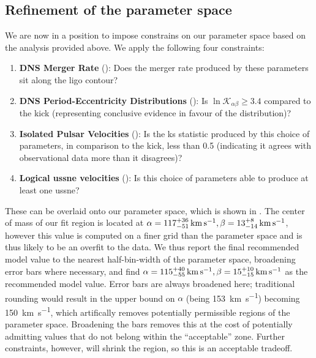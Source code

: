 \subsection{Refinement of the parameter space}

We are now in a position to impose constrains on our parameter space based on the analysis provided above. We apply the following four constraints:

\begin{enumerate}
    \item \textbf{DNS Merger Rate} (): Does the merger rate produced by these parameters sit along the \gls{ligo} contour?
    \item \textbf{DNS Period-Eccentricity Distributions} (): Is $\ln\mathcal{K}_{\alpha\beta}\geq 3.4$ compared to the \citet{Hobbs:2005} kick (representing conclusive evidence in favour of the distribution)?
    \item \textbf{Isolated Pulsar Velocities} (): Is the \gls{ks} statistic produced by this choice of parameters, in comparison to the \citet{Willcox:2021} kick, less than 0.5 (indicating it agrees with observational data more than it disagrees)?
    \item \textbf{Logical \gls{ussne} velocities} (): Is this choice of parameters able to produce at least one \gls{ussne}?
\end{enumerate}

These can be overlaid onto our parameter space, which is shown in . The center of mass of our fit region is located at $\alpha=\SI[parse-numbers = false]{117^{+36}_{-51}}{\km\per\s}, \beta=\SI[parse-numbers = false]{13^{+8}_{-14}}{\km\per\s}$, however this value is computed on a finer grid than the parameter space and is thus likely to be an overfit to the data. We thus report the final recommended model value to the nearest half-bin-width of the parameter space, broadening error bars where necessary, and find $\alpha=\SI[parse-numbers = false]{115^{+40}_{-55}}{\km\per\s}, \beta=\SI[parse-numbers = false]{15^{+10}_{-15}}{\km\per\s}$ as the recommended model value. Error bars are always broadened here; traditional rounding would result in the upper bound on $\alpha$ (being \SI{153}{\km\per\s}) becoming \SI{150}{\km\per\s}, which artifically removes potentially permissible regions of the parameter space. Broadening the bars removes this at the cost of potentially admitting values that do not belong within the ``acceptable'' zone. Further constraints, however, will shrink the region, so this is an acceptable tradeoff.

